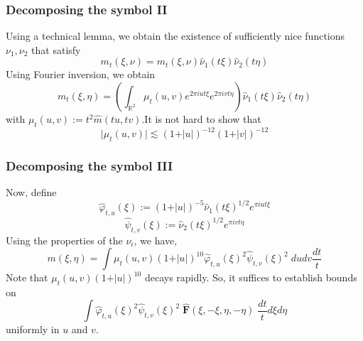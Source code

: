 \documentclass[usenames,dvipsnames,12pt]{beamer}
\begin{document}
\begin{frame}
\frametitle{Decomposing the symbol II}
Using a technical lemma, we obtain the existence of sufficiently nice functions $\nu_1, \nu_2$ that satisfy
\begin{equation*}
    m_t(\xi, \nu)= m_t(\xi, \nu)\hat{\nu}_1(t\xi)\hat{\nu}_2(t\eta)
\end{equation*}
\pause
Using Fourier inversion, we obtain
\begin{equation*}
m_t(\xi, \eta)=\left(\int_{\mathbb{R}^2}\mu_t(u, v) e^{2\pi i u t \xi}e^{2\pi i v t \eta}\right)\hat{\nu}_1(t\xi)\hat{\nu}_2(t\eta)
\end{equation*}
with $\mu_t(u, v):=t^2\hat{m}(tu, tv)$.\pause It is not hard to show that
\begin{equation*}
\vert \mu_t(u, v)\vert \lesssim (1+\vert u\vert)^{-12} (1+\vert v\vert)^{-12}
\end{equation*}

\end{frame}

\begin{frame}
\frametitle{Decomposing the symbol III}
Now, define
\begin{equation*}
\widehat{\varphi}_{t,u}(\xi):=(1+\vert u \vert)^{-5} \hat{\nu}_1(t\xi)^{1/2}e^{\pi i u t\xi}
\end{equation*}
\begin{equation*}
\widehat{\psi}_{t,v}(\xi):= \hat{\nu}_2(t\xi)^{1/2}e^{\pi i v t\eta}
\end{equation*}
\pause
Using the properties of the $\nu_i$, we have,
\begin{equation*}
m(\xi, \eta) = \int \mu_t(u, v)(1+\vert u \vert)^{10}\widehat{\varphi}_{t,u}(\xi)^2 \widehat{\psi}_{t,v}(\xi)^2\; du dv \dfrac{dt}{t}
\end{equation*}
\pause
Note that $\mu_t(u, v)(1+\vert u \vert)^{10}$ decays rapidly. So, it suffices to establish bounds on
\begin{equation*}
\int \widehat{\varphi}_{t,u}(\xi)^2 \widehat{\psi}_{t,v}(\xi)^2\; \widehat{\mathbf{F}}(\xi,-\xi,\eta,-\eta)\; \dfrac{dt}{t} d\xi d\eta
\end{equation*}
uniformly in $u$ and $v$.
\end{frame}
\end{document}
